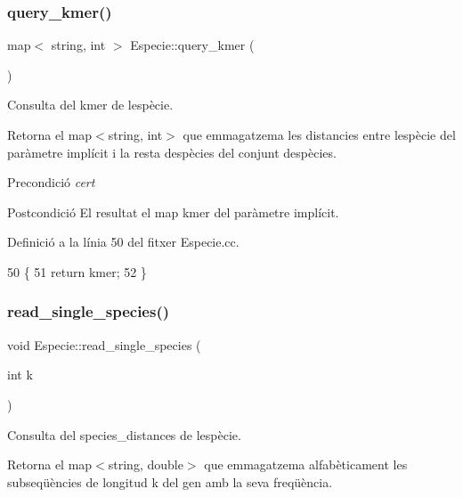 \subsubsection{\texorpdfstring{query\+\_\+kmer()}{query\_kmer()}}
{\footnotesize\ttfamily map$<$ string, int $>$ Especie\+::query\+\_\+kmer (\begin{DoxyParamCaption}{ }\end{DoxyParamCaption})}



Consulta del kmer de l\textquotesingle{}espècie. 

Retorna el map$<$string, int$>$ que emmagatzema les distancies entre l\textquotesingle{}espècie del paràmetre implícit i la resta d\textquotesingle{}espècies del conjunt d\textquotesingle{}espècies.

\begin{DoxyPrecond}{Precondició}
{\itshape cert} 
\end{DoxyPrecond}
\begin{DoxyPostcond}{Postcondició}
El resultat el map kmer del paràmetre implícit. 
\end{DoxyPostcond}


Definició a la línia 50 del fitxer Especie.\+cc.


\begin{DoxyCode}
50                                      \{
51     \textcolor{keywordflow}{return} kmer;
52 \}
\end{DoxyCode}
\mbox{\label{class_especie_a1a60c5306ae621527bb9183a5c64583f}} 
\subsubsection{\texorpdfstring{read\+\_\+single\+\_\+species()}{read\_single\_species()}}
{\footnotesize\ttfamily void Especie\+::read\+\_\+single\+\_\+species (\begin{DoxyParamCaption}\item[{int}]{k }\end{DoxyParamCaption})}



Consulta del species\+\_\+distances de l\textquotesingle{}espècie. 

Retorna el map$<$string, double$>$ que emmagatzema alfabèticament les subseqüències de longitud k del gen amb la seva freqüència.

